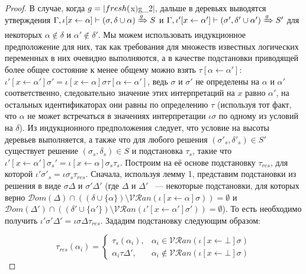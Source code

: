 \begin{proof}
      В случае, когда $g = \lstinline|fresh ($x$) $g_2$|$, дальше в деревьях выводятся утверждения $\Gamma, \iota[x \leftarrow \alpha] \vdash (\sigma, \delta \cup \alpha) \xRightarrow{g} S$ и $\Gamma, \iota'[x \leftarrow \alpha'] \vdash (\sigma', \delta' \cup \alpha') \xRightarrow{g} S'$ для некоторых $\alpha \not\in \delta$ и $\alpha' \not\in \delta'$. Мы можем использовать индукционное предположение для них, так как требования для множеств известных логических переменных в них очевидно выполняются, а в качестве подстановки приводящей более общее состояние к менее общему можно взять $\tau[\alpha \leftarrow \alpha']$: $\iota'[x \leftarrow \alpha'] \sigma' = \iota[x \leftarrow \alpha] \sigma \tau[\alpha \leftarrow \alpha']$, ведь $\sigma$ и $\sigma'$ не определены на $\alpha$ и $\alpha'$ соответственно, следовательно значение этих интерпретаций на $x$ равно $\alpha'$, на остальных идентификаторах они равны по определению $\tau$ (используя тот факт, что $\alpha$ не может встречаться в значениях интерпретации $\iota \sigma$ по одному из условий на $\delta$). Из индукционного предположения следует, что условие на высоты деревьев выполняется, а также что для любого решения $(\sigma'_s, \delta'_s) \in S'$ существует решение $(\sigma_s, \delta_s) \in S$ и подстановка $\tau_s$, такие что $\iota'[x \leftarrow \alpha'] \sigma_s' = \iota[x \leftarrow \alpha] \sigma_s \tau_s$.  Построим на её основе подстановку $\tau_{res}$, для которой $\iota' \sigma'_s = \iota \sigma_s \tau_{res}$. Сначала, используя лемму 1, представим подстановки из решения в виде $\sigma \Delta$ и  $\sigma' \Delta'$ (где $\Delta$ и $\Delta'$ ~--- некоторые подстановки, для которых верно $\mathcal{D}om(\Delta) \cap ((\delta \cup \{\alpha\}) \setminus \mathcal{VR}an(\iota[x \leftarrow \alpha] \sigma)) = \emptyset$ и $\mathcal{D}om(\Delta') \cap ((\delta' \cup \{\alpha'\}) \setminus \mathcal{VR}an(\iota'[x \leftarrow \alpha']  \sigma')) = \emptyset$). То есть необходимо получить $\iota' \sigma' \Delta' = \iota \sigma \Delta \tau_{res}$. Зададим подстановку следующим образом:
      
      \[\tau_{res}(\alpha_i) = \begin{cases}
      					                    \tau_s(\alpha_i), & \alpha_i \in \mathcal{VR}an(\iota[x \leftarrow \bot] \sigma) \\
      					                    \alpha_i \tau \Delta', & \alpha_i \not\in \mathcal{VR}an(\iota[x \leftarrow \bot] \sigma)
      					                  \end{cases} \]
    

\end{proof}
